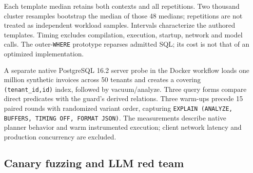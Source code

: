 \documentclass[sigconf,nonacm,natbib=false]{acmart}
\begin{document}
Each template median retains both contexts and all repetitions. Two thousand
cluster resamples bootstrap the median of those 48 medians; repetitions
are not treated as independent workload samples. Intervals characterize the
authored templates. Timing excludes compilation, execution, startup, network
and model calls. The outer-\texttt{WHERE} prototype reparses admitted SQL;
its cost is not that of an optimized implementation.

A separate native PostgreSQL 16.2 server probe in the Docker workflow loads one million
synthetic invoices across 50 tenants and creates a covering
\texttt{(tenant\_id,id)} index, followed by vacuum/analyze. Three query forms
compare direct predicates with the guard's derived relations. Three warm-ups
precede 15 paired rounds with randomized variant order, capturing
\texttt{EXPLAIN (ANALYZE, BUFFERS, TIMING OFF, FORMAT JSON)}.
The measurements describe native planner behavior and warm instrumented
execution; client network latency and production concurrency are excluded.

\subsection{Canary fuzzing and LLM red team}
\end{document}
